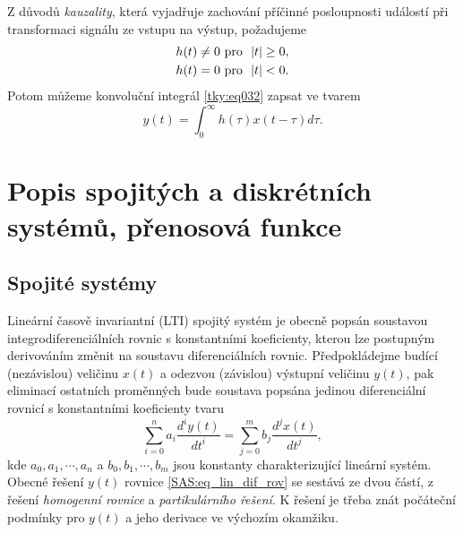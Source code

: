       Z důvodů \emph{kauzality}, která vyjadřuje zachování příčinné posloupnosti událostí při 
      transformaci signálu ze vstupu na výstup, požadujeme
      \begin{align}\label{SAS:eq_kauzalita_pozadavky}
        h(t) &\neq  0 \text{   pro } \abs{t} \geq0, \\
        h(t) &  =   0 \text{   pro } \abs{t} < 0. 
      \end{align}    
      Potom můžeme konvoluční integrál \ref{tky:eq032} zapsat ve tvarem
      \begin{equation}\label{SAS:eq_konvolucni_integral}
         y(t) = \int_0^{\infty}h(\tau)x(t-\tau)d\tau .
      \end{equation} 
  
  \section{Popis spojitých a diskrétních systémů, přenosová funkce}\label{tky:IchIIsecIII}
    \subsection{Spojité systémy}
      Lineární časově invariantní (LTI) spojitý systém je obecně popsán soustavou
      integrodiferenciálních rovnic s konstantními koeficienty, kterou lze postupným derivováním
      změnit na soustavu diferenciálních rovnic. Předpokládej\-me budící (ne\-zá\-vis\-lou) veličinu
      $x(t)$ a odezvou (závislou) výstupní veličinu $y(t)$, pak eliminací ostatních proměnných bude 
      soustava popsána jedinou diferenciální rovnicí s konstantními koeficienty tvaru
      \begin{equation}\label{SAS:eq_lin_dif_rov}
          \sum_{i=0}^na_i\frac{d^iy(t)}{dt^i}=\sum_{j=0}^mb_j\frac{d^jx(t)}{dt^j},
      \end{equation}
      kde $a_0, a_1, \cdots ,a_n$ a $b_0, b_1, \cdots ,b_m$ jsou konstanty charakterizující lineární
      systém. Obecné řešení $y(t)$ rovnice \ref{SAS:eq_lin_dif_rov} se sestává ze dvou částí, z 
      řešení \emph{homogenní rovnice} a \emph{partikulárního řešení}. K řešení je třeba znát 
      počáteční podmínky pro $y(t)$ a jeho derivace ve výchozím okamžiku.
  

